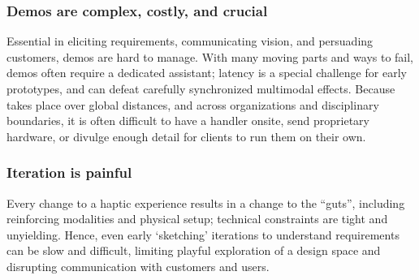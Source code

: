     \subsubsection{Demos are complex, costly, and crucial}
    \noindent
    Essential in eliciting requirements, communicating vision, and persuading customers, demos are %
    hard to manage.
    With many moving parts and ways to fail, demos often require a dedicated assistant;
    latency is a special challenge for early prototypes, and can defeat carefully synchronized multimodal effects. %
    Because \haxd takes place over global distances, %
    and across  organizations and disciplinary boundaries, %
    it is often difficult to have a handler onsite, send proprietary hardware, or divulge enough detail for clients to run them on their own. %

    \subsubsection{Iteration is painful}    
    \noindent
    Every change to a haptic experience results in a change to the ``guts'', including reinforcing modalities and physical setup;
    technical constraints are tight and unyielding.
    Hence, even early `sketching' iterations to understand requirements can be slow and difficult, limiting playful exploration of a design space and disrupting communication with customers and users. %
    
